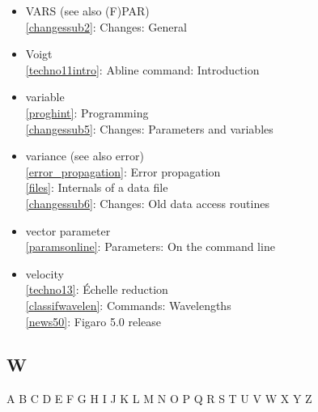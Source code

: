 \documentclass[11pt,twoside]{article}
\newcommand{\htmlref}[2]{#1}
\newcommand{\idxint}[2]{\ref{#1}: \htmlref{#2}{#1}}
\newcommand{\idxint}[2]{\htmlref{#2}{#1}}
\begin{document}
\begin{itemize}
\item VARS (see also (F)PAR)\\
   \idxint{changessub2}{Changes: General}
\item Voigt\\
   \idxint{techno11intro}{Abline command: Introduction}
\item variable\\
   \idxint{proghint}{Programming}\\
   \idxint{changessub5}{Changes: Parameters and variables}
\item variance (see also error)\\
   \idxint{error_propagation}{Error propagation}\\
   \idxint{files}{Internals of a data file}\\
   \idxint{changessub6}{Changes: Old data access routines}
\item vector parameter\\
   \idxint{paramsonline}{Parameters: On the command line}
\item velocity\\
   \idxint{techno13}{\'Echelle reduction}\\
   \idxint{classifwavelen}{Commands: Wavelengths}\\
   \idxint{news50}{Figaro 5.0 release}
\end{itemize}

\subsection*{\label{index_W}W}

\begin{htmlonly}
\htmlref{A}{index_A}
\htmlref{B}{index_B}
\htmlref{C}{index_C}
\htmlref{D}{index_D}
\htmlref{E}{index_E}
\htmlref{F}{index_F}
\htmlref{G}{index_G}
\htmlref{H}{index_H}
\htmlref{I}{index_I}
\htmlref{J}{index_J}
\htmlref{K}{index_K}
\htmlref{L}{index_L}
\htmlref{M}{index_M}
\htmlref{N}{index_N}
\htmlref{O}{index_O}
\htmlref{P}{index_P}
\htmlref{Q}{index_Q}
\htmlref{R}{index_R}
\htmlref{S}{index_S}
\htmlref{T}{index_T}
\htmlref{U}{index_U}
\htmlref{V}{index_V}
W
\htmlref{X}{index_X}
\htmlref{Y}{index_Y}
Z
\end{htmlonly}
\end{document}
